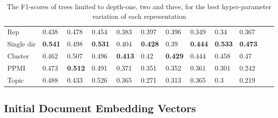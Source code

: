 {\begin{landscape}
\begin{table}[]
\begin{tabular}{llll@{\hskip 0.25in}lll@{\hskip 0.25in}lllll}
			\toprule[\heavyrulewidth]
			Rep               & 0.438                           & 0.478                           & 0.454                           & 0.383                           & 0.397                           & 0.396                           & 0.349                           & 0.34                            & 0.367                           &             &             \\
			Single dir        & \textbf{0.541} & 0.498                           & \textbf{0.531} & 0.404                           & \textbf{0.428} & 0.39                            & \textbf{0.444} & \textbf{0.533} & \textbf{0.473} &             &             \\
			Cluster           & 0.462                           & 0.507                           & 0.496                           & \textbf{0.413} & 0.42                            & \textbf{0.429} & 0.444                           & 0.458                           & 0.47                            &             &             \\
			PPMI              & 0.473                           & \textbf{0.512} & 0.491                           & 0.371                           & 0.351                           & 0.352                           & 0.361                           & 0.301                           & 0.242                           &             &             \\
			Topic             & 0.488                           & 0.433                           & 0.526                           & 0.365                           & 0.271                           & 0.313                           & 0.365                           & 0.3                             & 0.219                           &             &             \\   
		\end{tabular}
		\caption{The F1-scores of trees limited to depth-one, two and three, for the best hyper-parameter variation of each representation}
	\end{table}\label{bg:repsresults}
\end{landscape}
}
\subsection{Initial Document Embedding Vectors}\label{ch3:initialreps}

